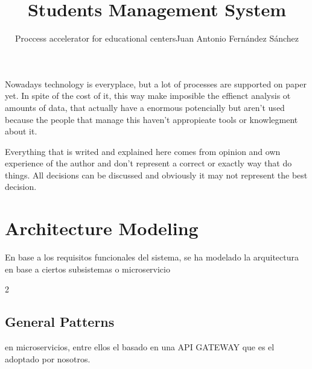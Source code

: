 \documentclass[oneside,english,titlepage]{scrbook}
\begin{document}
\title{Students Management System}

\subtitle{Proccess accelerator for educational centers}

\subtitle{Juan Antonio Fern\'andez S\'anchez}
\maketitle

Nowadays technology is everyplace, but a lot of processes are supported
on paper yet. In spite of the cost of it, this way make imposible
the effienct analysis ot amounts of data, that actually have a enormous
potencially but aren't used because the people that manage this haven't
appropieate tools or knowlegment about it.

\pagebreak{}


Everything that is writed and explained here comes from opinion and
own experience of the author and don't represent a correct or exactly
way that do things. All decisions can be discussed and obviously it
may not represent the best decision.

\pagebreak{}

\tableofcontents{}



\chapter{Architecture Modeling}

En base a los requisitos funcionales del sistema, se ha modelado la
arquitectura en base a ciertos subsistemas o microservicio

2

\section{General Patterns}


en microservicios, entre ellos el basado en una API GATEWAY que es
el adoptado por nosotros.
\end{document}
